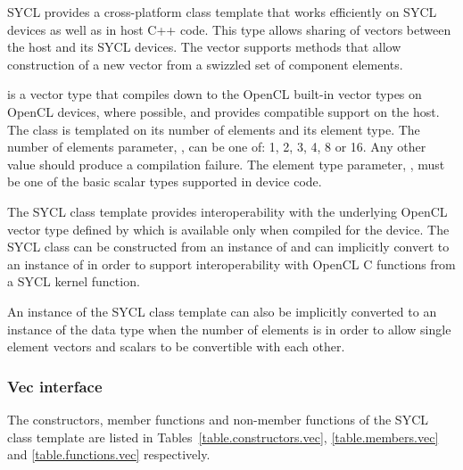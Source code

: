 

SYCL provides a cross-platform class template that works
efficiently on SYCL devices as well as in host C++ code. This type
allows sharing of vectors between the host and its SYCL devices. The
vector supports methods that allow construction of a new vector from a
swizzled set of component elements.

 is a vector type that
compiles down to the OpenCL built-in vector types on OpenCL devices, where
possible, and provides compatible support on the host. The 
class is templated on its number of elements and its element type. The number of
elements parameter, , can be one of: 1, 2, 3, 4, 8 or 16. Any
other value should produce a compilation failure. The element type parameter,
, must be one of the basic scalar types supported in device code.

The SYCL  class template provides interoperability with the
underlying OpenCL vector type defined by  which is
available only when compiled for the device. The SYCL  class can
be constructed from an instance of  and can implicitly
convert to an instance of  in order to support
interoperability with OpenCL C functions from a SYCL kernel function.

An instance of the SYCL  class template can also be
implicitly converted to an instance of the data type when the number of
elements is  in order to allow single element vectors and
scalars to be convertible with each other.

\subsubsection{Vec interface}

The constructors, member functions and non-member functions of the SYCL  class template are listed in Tables~\ref{table.constructors.vec}, \ref{table.members.vec} and \ref{table.functions.vec} respectively.

